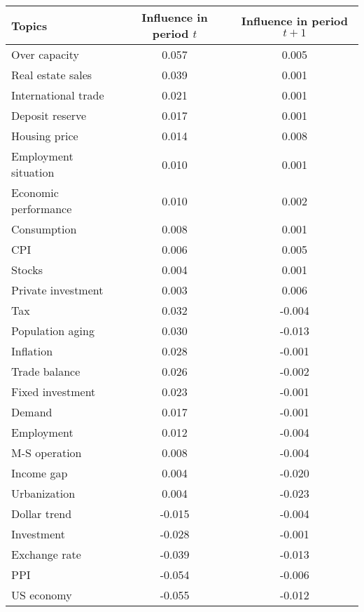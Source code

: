 \documentclass[10pt]{article}
\begin{document}
\begin {table}
 \begin {center}
 \begin {tabular} {lcc}
\hline
Topics	                         &	Influence in period $t$	   &	Influence in period $t+1$	\\
\hline
Over capacity	                &	0.057       &	0.005	\\
Real estate sales	        &	0.039	&	0.001	\\
International trade	        &	0.021	&	0.001	\\
Deposit reserve	                &	0.017	 &	0.001	\\
Housing price	                &	0.014	&	0.008	\\
Employment situation	&	0.010	&	0.001	\\
Economic performance	&	0.010	&	0.002	\\
Consumption	                 &	0.008	&	0.001	\\
CPI	                                  &	0.006	&	0.005	\\
Stocks	                          &	0.004	&	0.001	\\
Private investment	        &	0.003	&	0.006	\\
\hline
Tax	                                 &	0.032	&	-0.004	\\
Population aging	        &	0.030	&	-0.013	\\
Inflation	                         &	0.028	&	-0.001	\\
Trade balance	                 &	0.026	&	-0.002	\\
Fixed investment	        &	0.023	&	-0.001	\\
Demand	                        &	0.017	&	-0.001	\\
Employment	               &	0.012	&	-0.004	\\
M-S operation	               &	0.008	&	-0.004	\\
Income gap	               &	0.004	&	-0.020	\\
Urbanization	               &	0.004	&	-0.023	\\
\hline
Dollar trend	               &	-0.015	&	-0.004	\\
Investment	               &	-0.028	&	-0.001	\\
Exchange rate	                &	-0.039	&	-0.013	\\
PPI	                                &	-0.054	&	-0.006	\\
US economy	               &	-0.055	&	-0.012	\\

\end{tabular}
\end{center}
\end{table}
\end{document}
